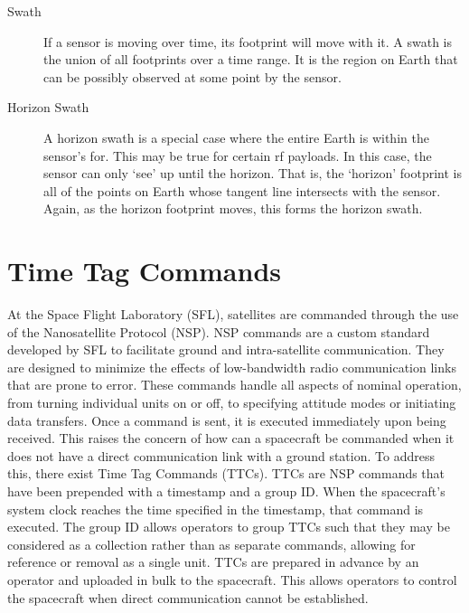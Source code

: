 \begin{description}
    \item[Swath] If a sensor is moving over time, its footprint will move with
	it. A swath is the union of all footprints over a time range.  It is
	the region on Earth that can be possibly observed at some point by the
	sensor.

    \item[Horizon Swath] A horizon swath is a special case where the entire
	Earth is within the sensor's \gls{for}. This may be true for certain
	\gls{rf} payloads. In this case, the sensor can only `see' up until the
	horizon. That is, the `horizon' footprint is all of the points on Earth
	whose tangent line intersects with the sensor. Again, as the horizon
	footprint moves, this forms the horizon swath.

\end{description}



\section{Time Tag Commands}

At the Space Flight Laboratory (SFL), satellites are commanded through the use
of the Nanosatellite Protocol (NSP). NSP commands are a custom standard
developed by SFL to facilitate ground and intra-satellite communication. They
are designed to minimize the effects of low-bandwidth radio communication links
that are prone to error. These commands handle all aspects of nominal
operation, from turning individual units on or off, to specifying attitude
modes or initiating data transfers. Once a command is sent, it is executed
immediately upon being received. This raises the concern of how can a
spacecraft be commanded when it does not have a direct communication link with
a ground station. To address this, there exist Time Tag Commands (TTCs). TTCs
are NSP commands that have been prepended with a timestamp and a group ID. When
the spacecraft’s system clock reaches the time specified in the timestamp, that
command is executed. The group ID allows operators to group TTCs such that they
may be considered as a collection rather than as separate commands, allowing
for reference or removal as a single unit. TTCs are prepared in advance by an
operator and uploaded in bulk to the spacecraft. This allows operators to
control the spacecraft when direct communication cannot be established.

